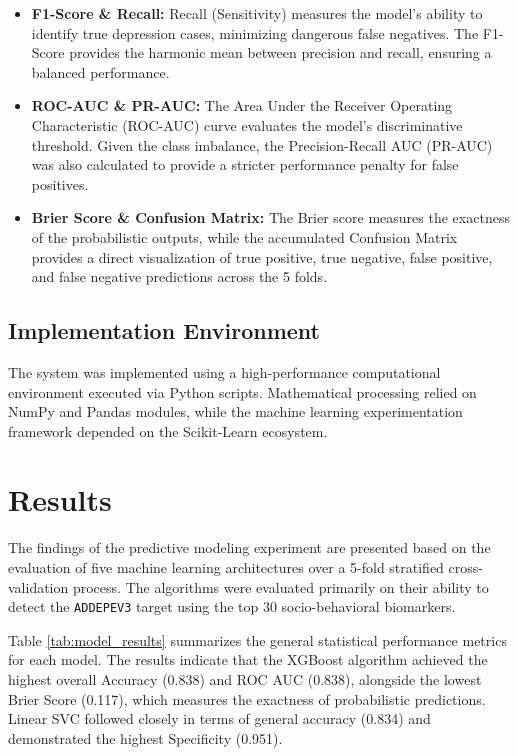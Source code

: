 \documentclass[conference]{IEEEtran}
\begin{document}
\begin{itemize}
    \item \textbf{F1-Score \& Recall:} Recall (Sensitivity) measures the model's ability to identify true depression cases, minimizing dangerous false negatives. The F1-Score provides the harmonic mean between precision and recall, ensuring a balanced performance. %
    \item \textbf{ROC-AUC \& PR-AUC:} The Area Under the Receiver Operating Characteristic (ROC-AUC) curve evaluates the model's discriminative threshold. Given the class imbalance, the Precision-Recall AUC (PR-AUC) was also calculated to provide a stricter performance penalty for false positives. %
    \item \textbf{Brier Score \& Confusion Matrix:} The Brier score measures the exactness of the probabilistic outputs, while the accumulated Confusion Matrix provides a direct visualization of true positive, true negative, false positive, and false negative predictions across the 5 folds. %
\end{itemize}

\subsection{Implementation Environment}
The system was implemented using a high-performance computational environment executed via Python scripts. Mathematical processing relied on NumPy \cite{harris2020array} %
and Pandas \cite{mckinney2010pandas} %
modules, while the machine learning experimentation framework depended on the Scikit-Learn \cite{scikit-learn} %
ecosystem.


\section{Results}

The findings of the predictive modeling experiment are presented based on the evaluation of five machine learning architectures over a 5-fold stratified cross-validation process. The algorithms were evaluated primarily on their ability to detect the \texttt{ADDEPEV3} target using the top 30 socio-behavioral biomarkers.

Table \ref{tab:model_results} summarizes the general statistical performance metrics for each model. The results indicate that the XGBoost algorithm achieved the highest overall Accuracy (0.838) and ROC AUC (0.838), alongside the lowest Brier Score (0.117), which measures the exactness of probabilistic predictions. Linear SVC followed closely in terms of general accuracy (0.834) and demonstrated the highest Specificity (0.951). 
\end{document}
